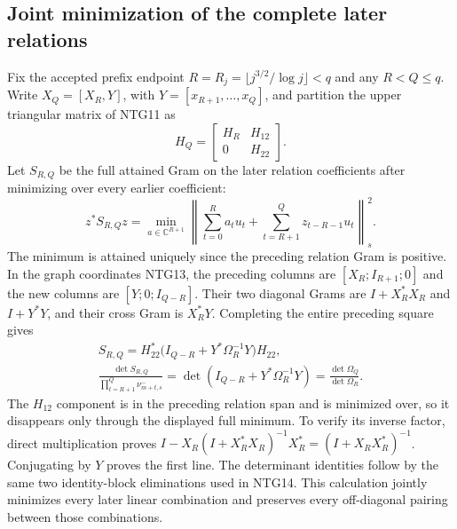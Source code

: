 \documentclass[11pt,a4paper]{article}
\begin{document}
\subsection{Joint minimization of the complete later relations}
Fix the accepted prefix endpoint
$R=R_j=\lfloor j^{3/2}/\log j\rfloor<q$ and any $R<Q\le q$.
Write $X_Q=[X_R,Y]$, with
$Y=[x_{R+1},\ldots,x_Q]$, and partition the upper triangular
matrix of NTG11 as
\[
 H_Q=\begin{bmatrix}H_R&H_{12}\\0&H_{22}\end{bmatrix}.
                                                               \tag{NTG23}
\]
Let $S_{R,Q}$ be the full attained Gram on the later relation
coefficients after minimizing over every earlier coefficient:
\[
 z^*S_{R,Q}z
   =\min_{a\in\mathbb C^{R+1}}
       \left\|\sum_{t=0}^Ra_tu_t+
                    \sum_{t=R+1}^Qz_{t-R-1}u_t\right\|_s^2 .
                                                               \tag{NTG24}
\]
The minimum is attained uniquely since the preceding relation
Gram is positive. In the graph coordinates NTG13, the
preceding columns are $[X_R;I_{R+1};0]$ and the new columns
are $[Y;0;I_{Q-R}]$. Their two diagonal Grams are
$I+X_R^*X_R$ and $I+Y^*Y$, and their cross Gram is
$X_R^*Y$. Completing the entire preceding square gives
\[
\begin{gathered}
 S_{R,Q}
  =H_{22}^*\bigl(I_{Q-R}+Y^*\Omega_R^{-1}Y\bigr)H_{22},\\
 \frac{\det S_{R,Q}}
      {\displaystyle\prod_{t=R+1}^Q\nu_{m+t,s}^-}
  =\det(I_{Q-R}+Y^*\Omega_R^{-1}Y)
  =\frac{\det\Omega_Q}{\det\Omega_R}.
\end{gathered}                                                    \tag{NTG25}
\]
The $H_{12}$ component is in the preceding relation span
and is minimized over, so it disappears only through the
displayed full minimum. To verify its inverse factor,
direct multiplication proves
$I-X_R(I+X_R^*X_R)^{-1}X_R^*=(I+X_RX_R^*)^{-1}$.
Conjugating by $Y$ proves the first line. The determinant
identities follow by the same two identity-block
eliminations used in NTG14. This calculation jointly
minimizes every later linear combination and preserves
every off-diagonal pairing between those combinations.
\end{document}
